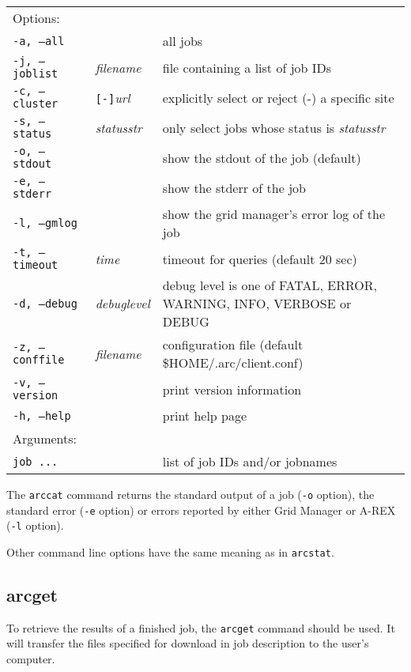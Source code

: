 \hspace*{0.5cm}
\begin{shaded}
\end{shaded}
\begin{longtable}{llp{8cm}}
   Options:&&\\
   \texttt{-a, --all}& & all jobs\\
   \texttt{-j, --joblist}& \textit{filename} & file containing a list of job IDs\\
   \texttt{-c, --cluster}&\verb#[-]#\textit{url}&explicitly select or reject (-) a specific site\\
   \texttt{-s, --status}& \textit{statusstr} &only select jobs whose status is \textit{statusstr}\\
   \texttt{-o, --stdout}& & show the stdout of the job (default)\\
   \texttt{-e, --stderr}& & show the stderr of the job\\
   \texttt{-l, --gmlog}& & show the grid manager's error log of the job\\
   \texttt{-t, --timeout}& \textit{time} & timeout for queries (default 20 sec)\\
   \texttt{-d, --debug}& \textit{debuglevel}&debug level is one of  FATAL, ERROR, WARNING, INFO, VERBOSE or DEBUG\\
   \texttt{-z, --conffile}&\textit{filename}& configuration file (default {\$}HOME/.arc/client.conf)\\
   \texttt{-v, --version}& & print version information\\
   \texttt{-h, --help}& & print help page\\
   Arguments:&&\\
   \texttt{job ...} && list of job IDs and/or jobnames\\
\end{longtable}

The \texttt{arccat} command returns the standard output of a job
(\texttt{-o} option), the standard error (\texttt{-e} option) or
errors reported by either Grid Manager or A-REX (\texttt{-l} option).

Other command line options have the same meaning as in \verb#arcstat#.


\subsection{arcget}
\label{sec:arcget}

To retrieve the results of a finished job, the \texttt{arcget}
 command should be used. It
will transfer the files specified for download in job description
to the user's computer.

